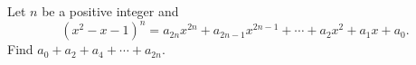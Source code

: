 Let $n$ be a positive integer and
\[\left(x^2-x-1\right)^n=a_{2n}x^{2n}+a_{2n-1}x^{2n-1}+\cdots+a_2x^2+a_1x+a_0.\]
Find $a_0+a_2+a_4+\cdots+a_{2n}$.
